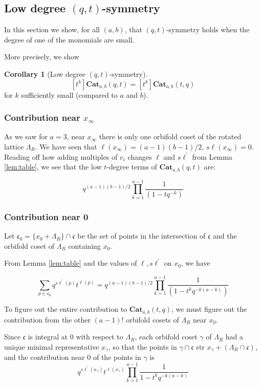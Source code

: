 \documentclass{amsart}[12pt]
\theoremstyle{definition}
\newtheorem{corollary}[dummy]{Corollary}
\newcommand{\Cat}{\mathbf{Cat}}
\newcommand{\sk}{s\ell}
\newcommand{\cone}{\mathfrak{c}}
\begin{document}
\subsection{Low degree \texorpdfstring{$(q,t)$}{(q,t)}-symmetry}
In this section we show, for all $(a,b)$, that $(q,t)$-symmetry holds when the degree of one of the monomials are small.  


More precisely, we show
\begin{corollary}[Low degree $(q,t)$-symmetry]
$$[t^k]\Cat_{a,b}(q,t)=[t^k]\Cat_{a,b}(t,q)$$
for $k$ sufficiently small (compared to $a$ and $b$).
\end{corollary}


\subsubsection{Contribution near $x_\infty$}
As we saw for $a=3$, near $x_\infty$ there is only one orbifold coset of the rotated lattice $\Lambda_R$.  We have seen that $\ell(x_\infty)=(a-1)(b-1)/2$, $\sk(x_\infty)=0$.  Reading off how adding multiples of $v_i$ changes $\ell$ and $\sk^\prime$ from Lemma \ref{lem:table}, we see that the low $t$-degree terms of $\Cat_{a,b}(q,t)$ are:

$$q^{(a-1)(b-1)/2}\prod_{k=1}^{a-1}\frac{1}{(1-tq^{-k})}$$


\subsubsection{Contribution near 0}
Let $\cone_0=\{x_0+\Lambda_R\}\cap\cone$ be the set of points in the intersection of $\cone$ and the orbifold coset of $\Lambda_R$ containing $x_0$.

From Lemma \ref{lem:table} and the values of $\ell, \sk^\prime$ on $x_0$, we have

$$\sum_{p\in\cone_0} q^{\sk^\prime(p)}t^{\ell(p)}=q^{(a-1)(b-1)/2}\prod_{k=1}^{a-1} \frac{1}{(1-t^kq^{-k(a-k)})}$$

To figure out the entire contribution to $\Cat_{a,b}(t,q)$, we must figure out the contribution from the other $(a-1)!$ orbifold cosets of $\Lambda_R$ near $x_0$.  

Since $\cone$ is integral at $0$ with respect to $\Lambda_R$, each orbifold coset $\gamma$ of $\Lambda_R$  had a unique minimal representative $x_\gamma$, so that the points in $\gamma\cap\cone$ str $x_\gamma+\left(\Lambda_R\cap \cone\right)$,  and the contribution near $0$ of the points in $\gamma$ is 
$$q^{\sk^\prime(x_\gamma)}t^{\ell(x_\gamma)}\prod_{k=1}^{a-1}\frac{1}{1-t^kq^{-k(a-k)}}$$
\end{document}
